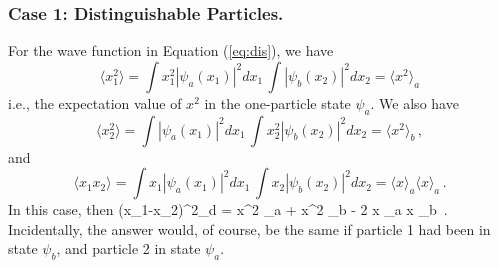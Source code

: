 \subsubsection{Case 1: Distinguishable Particles.}
For the wave function in Equation (\ref{eq:dis}), we have
\[
\langle x_1^2 \rangle = \int x_1^2 |\psi_a(x_1)|^2dx_1\, \int |\psi_b(x_2)|^2dx_2 = \langle x^2 \rangle_a
\]
i.e., the expectation value of $x^2$ in the one-particle state $\psi_a$. We also have
\[
\langle x_2^2 \rangle = \int  |\psi_a(x_1)|^2dx_1\, \int x_2^2 |\psi_b(x_2)|^2dx_2 = \langle x^2 \rangle_b\, ,
\]
and
\[
\langle x_1 x_2 \rangle = \int x_1 |\psi_a(x_1)|^2dx_1\, \int x_2 |\psi_b(x_2)|^2 dx_2 = \langle x \rangle_a \langle x \rangle_a\, .
\]
In this case, then
\be
\langle(x_1-x_2)^2\rangle_d = \langle x^2 \rangle_a + \langle x^2 \rangle_b - 2 \langle x \rangle_a \langle x \rangle_b \,.
\label{eq:sepd}
\ee
Incidentally, the answer would, of course, be the same if particle 1 had been in state $\psi_b$, and particle 2 in state $\psi_a$.


